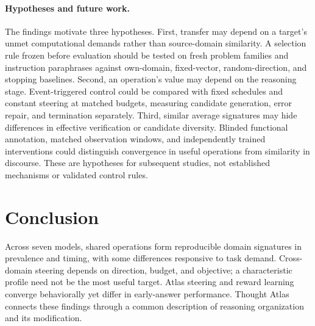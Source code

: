 \paragraph{Hypotheses and future work.}
The findings motivate three hypotheses. First, transfer may depend on a target's unmet computational demands rather than source-domain similarity. A selection rule frozen before evaluation should be tested on fresh problem families and instruction paraphrases against own-domain, fixed-vector, random-direction, and stopping baselines. Second, an operation's value may depend on the reasoning stage. Event-triggered control could be compared with fixed schedules and constant steering at matched budgets, measuring candidate generation, error repair, and termination separately. Third, similar average signatures may hide differences in effective verification or candidate diversity. Blinded functional annotation, matched observation windows, and independently trained interventions could distinguish convergence in useful operations from similarity in discourse. These are hypotheses for subsequent studies, not established mechanisms or validated control rules.

\section{Conclusion}
Across seven models, shared operations form reproducible domain signatures in prevalence and timing, with some differences responsive to task demand. Cross-domain steering depends on direction, budget, and objective; a characteristic profile need not be the most useful target. Atlas steering and reward learning converge behaviorally yet differ in early-answer performance. Thought Atlas connects these findings through a common description of reasoning organization and its modification.
